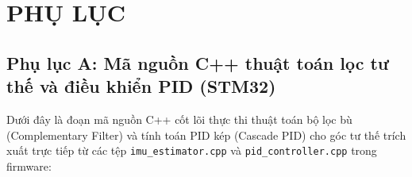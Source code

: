 \section*{PHỤ LỤC}

\subsection*{Phụ lục A: Mã nguồn C++ thuật toán lọc tư thế và điều khiển PID (STM32)}

Dưới đây là đoạn mã nguồn C++ cốt lõi thực thi thuật toán bộ lọc bù (Complementary Filter) và tính toán PID kép (Cascade PID) cho góc tư thế trích xuất trực tiếp từ các tệp \texttt{imu\_estimator.cpp} và \texttt{pid\_controller.cpp} trong firmware:


